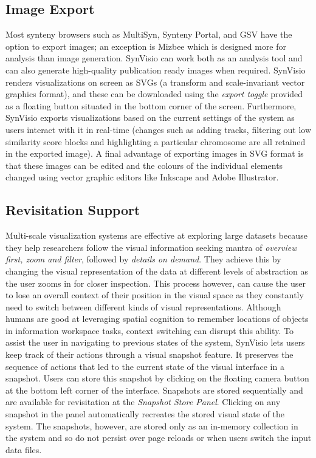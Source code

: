 \subsection{Image Export}
Most synteny browsers such as MultiSyn, Synteny Portal, and GSV\cite{baek2016multisyn,lee2016syntenyportal,revanna2011gsv} have the option to export images; an exception is Mizbee\cite{Meyer2009} which is designed more for analysis than image generation. SynVisio can work both as an analysis tool and can also generate high-quality publication ready images when required. SynVisio renders visualizations on screen as SVGs (a transform and scale-invariant vector graphics format), and these can be downloaded using the \textit{export toggle} provided as a floating button situated in the bottom corner of the screen. Furthermore, SynVisio exports visualizations based on the current settings of the system as users interact with it in real-time (changes such as adding tracks, filtering out low similarity score blocks and highlighting a particular chromosome are all retained in the exported image). A final advantage of exporting images in SVG format is that these images can be edited and the colours of the individual elements changed using vector graphic editors like Inkscape and Adobe Illustrator.

\subsection{Revisitation Support}
Multi-scale visualization systems are effective at exploring large datasets because they help researchers follow the visual information seeking mantra of \textit{overview first, zoom and filter}, followed by \textit{details on demand}\cite{Shneiderman96theeyes}. They achieve this by changing the visual representation of the data at different levels of abstraction as the user zooms in for closer inspection\cite{Stolte}. This process however, can cause the user to lose an overall context of their position in the visual space as they constantly need to switch between different kinds of visual representations.
Although humans are good at leveraging spatial cognition to remember locations of objects in information workspace tasks\cite{datamountain}, context switching can disrupt this ability. To assist the user in navigating to previous states of the system, SynVisio lets users keep track of their actions through a visual snapshot feature. It preserves the sequence of actions that led to the current state of the visual interface in a snapshot. Users can store this snapshot by clicking on the floating camera button at the bottom left corner of the interface. Snapshots are stored sequentially and are available for revisitation at the \textit{Snapshot Store Panel}. Clicking on any snapshot in the panel automatically recreates the stored visual state of the system. The snapshots, however, are stored only as an in-memory collection in the system and so do not persist over page reloads or when users switch the input data files.


